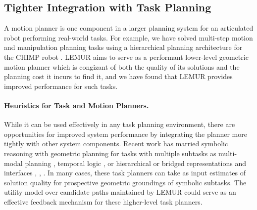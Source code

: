 %
%
%

\subsection{Tighter Integration with Task Planning}

A motion planner is one component in a larger planning system for
an articulated robot performing real-world tasks.
For example,
we have solved multi-step motion and manipulation planning tasks
using a hierarchical planning architecture for the CHIMP robot
\citep{dellin2014drc}.
LEMUR aims to serve as a performant lower-level geometric motion
planner which is congizant of both the quality of its solutions
and the planning cost it incurs to find it,
and we have found that LEMUR provides improved performance for
such tasks.

\paragraph{Heuristics for Task and Motion Planners.}
While it can be used effectively in any task planning environment,
there are  opportunities for improved system performance by
integrating the planner more tightly with other system components.
Recent work has married symbolic reasoning with geometric planning
for tasks with multiple subtasks
as multi-modal planning \citep{hauser2010multi},
temporal logic \citep{bhatia2010temporalgoals},
or hierarchical or bridged representations and interfaces
\citep{cambon2009hybrid}, \citep{gravot2005asymov},
\citep{srivastava2014taskmotion}.
In many cases, these task planners can take as input estimates
of solution quality
for prospective geometric groundings of symbolic subtasks.
The utility model over candidate paths maintained by LEMUR could
serve as an effective feedback mechanism for these higher-level
task planners.

